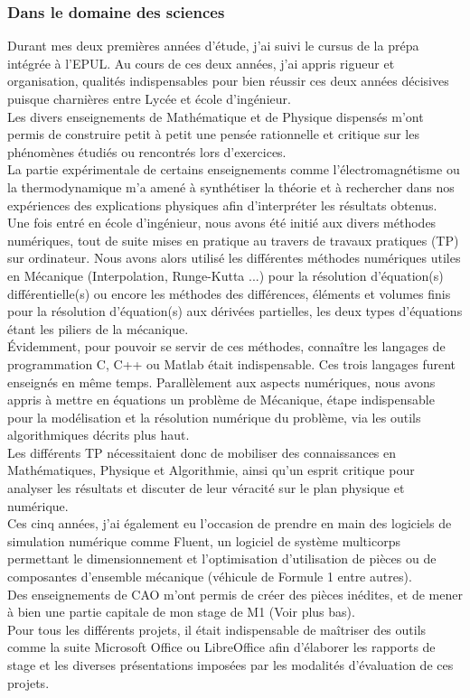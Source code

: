 \documentclass[french]{article}
\newcommand{\sbrown}{\color{sbrown}}
\begin{document}
 \subsubsection*{\sbrown Dans le domaine des sciences}
 Durant mes deux premières années d'étude, j'ai suivi le cursus de la prépa intégrée à l'EPUL. Au cours de ces deux années, j'ai appris rigueur et organisation, qualités indispensables pour bien réussir ces deux années décisives puisque charnières entre Lycée et école d'ingénieur.\\
 Les divers enseignements de Mathématique et de Physique dispensés m'ont permis de construire petit à petit une pensée rationnelle et critique sur les phénomènes étudiés ou rencontrés lors d'exercices.\\
 La partie expérimentale de certains enseignements comme l'électromagnétisme ou la thermodynamique m'a amené à synthétiser la théorie et à rechercher dans nos expériences des explications physiques afin d'interpréter les résultats obtenus.\\
 Une fois entré en école d'ingénieur, nous avons été initié aux divers méthodes numériques, tout de suite mises en pratique au travers de travaux pratiques (TP) sur ordinateur. Nous avons alors utilisé les différentes méthodes numériques utiles en Mécanique (Interpolation, Runge-Kutta ...) pour la résolution d'équation(s) différentielle(s) ou encore les méthodes des différences, éléments et volumes finis pour la résolution d'équation(s) aux dérivées partielles, les deux types d'équations étant les piliers de la mécanique.\\
 Évidemment, pour pouvoir se servir de ces méthodes, connaître les langages de programmation C, C++ ou Matlab était indispensable. Ces trois langages furent enseignés en même temps. 
 Parallèlement aux aspects numériques, nous avons appris à mettre en équations un problème de Mécanique, étape indispensable pour la modélisation et la résolution numérique du problème, via les outils algorithmiques décrits plus haut. \\
 Les différents TP nécessitaient donc de mobiliser des connaissances en Mathématiques, Physique et Algorithmie, ainsi qu'un esprit critique pour analyser les résultats et discuter de leur véracité sur le plan physique et numérique.\\
 
 Ces cinq années, j'ai également eu l'occasion de prendre en main des logiciels de simulation numérique comme Fluent, un logiciel de système multicorps permettant le dimensionnement et l'optimisation d'utilisation de pièces ou de composantes d'ensemble mécanique (véhicule de Formule 1 entre autres).\\
 Des enseignements de CAO m'ont permis de créer des pièces inédites, et de mener à bien une partie capitale de mon stage de M1 (Voir plus bas).\\
 Pour tous les différents projets, il était indispensable de maîtriser des outils comme la suite Microsoft Office ou LibreOffice afin d'élaborer les rapports de stage et les diverses présentations imposées par les modalités d'évaluation de ces projets.
 
\end{document}
